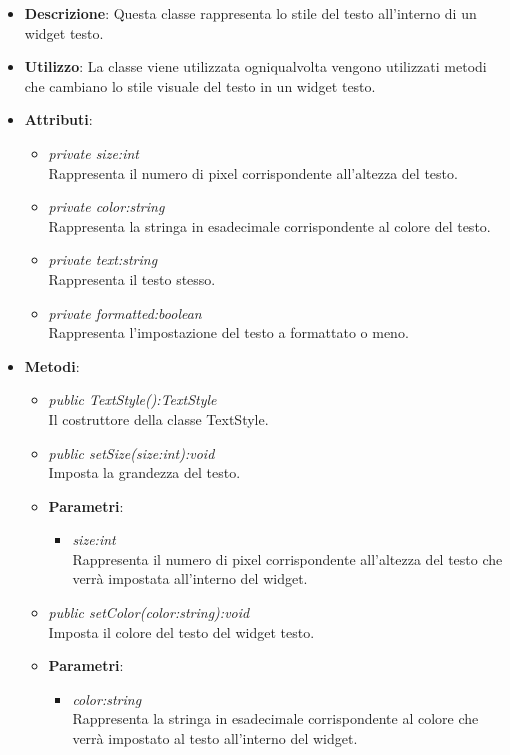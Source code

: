 \begin{itemize}
\item \textbf{Descrizione}: Questa classe rappresenta lo stile del testo all'interno di un widget testo.
\item \textbf{Utilizzo}: La classe viene utilizzata ogniqualvolta vengono utilizzati metodi che cambiano lo stile visuale del testo in un widget testo.
\item \textbf{Attributi}:
	\begin{itemize}
	\item \textit{private size:int}\\
	Rappresenta il numero di pixel corrispondente all'altezza del testo.
	\item \textit{private color:string}\\
	Rappresenta la stringa in esadecimale corrispondente al colore del testo.
	\item \textit{private text:string}\\
	Rappresenta il testo stesso. 
	\item \textit{private formatted:boolean}\\
	Rappresenta l'impostazione del testo a formattato o meno.
	\end{itemize}
\item \textbf{Metodi}:
	\begin{itemize}
	\item \textit{public TextStyle():TextStyle}\\
	Il costruttore della classe TextStyle.
	\item \textit{public setSize(size:int):void}\\
	Imposta la grandezza del testo.
		\item{\textbf{Parametri}: \begin{itemize}
		\item \textit{size:int}\\
		Rappresenta il numero di pixel corrispondente all'altezza del testo che verrà impostata all'interno del widget.
		\end{itemize}}
	\item \textit{public setColor(color:string):void}\\
	Imposta il colore del testo del widget testo.
		\item{\textbf{Parametri}: \begin{itemize}
		\item \textit{color:string}\\
		Rappresenta la stringa in esadecimale corrispondente al colore che verrà impostato al testo all'interno del widget.

\end{itemize}}
\end{itemize}
\end{itemize}
